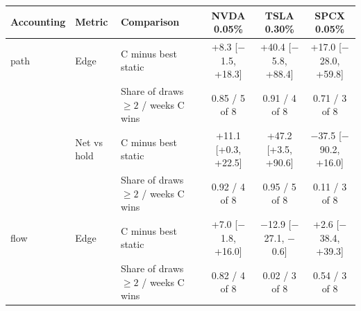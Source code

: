 \begin{tabular}{lllccc}
\toprule
Accounting & Metric & Comparison & NVDA 0.05\% & TSLA 0.30\% & SPCX 0.05\% \\
\midrule
path & Edge & C minus best static & +8.3 [$-$1.5, +18.3] & +40.4 [$-$5.8, +88.4] & +17.0 [$-$28.0, +59.8] \\
 &  & Share of draws $\geq 2$ / weeks C wins & 0.85 / 5 of 8 & 0.91 / 4 of 8 & 0.71 / 3 of 8 \\
 & Net vs hold & C minus best static & +11.1 [+0.3, +22.5] & +47.2 [+3.5, +90.6] & $-$37.5 [$-$90.2, +16.0] \\
 &  & Share of draws $\geq 2$ / weeks C wins & 0.92 / 4 of 8 & 0.95 / 5 of 8 & 0.11 / 3 of 8 \\
flow & Edge & C minus best static & +7.0 [$-$1.8, +16.0] & $-$12.9 [$-$27.1, $-$0.6] & +2.6 [$-$38.4, +39.3] \\
 &  & Share of draws $\geq 2$ / weeks C wins & 0.82 / 4 of 8 & 0.02 / 3 of 8 & 0.54 / 3 of 8 \\
\bottomrule
\end{tabular}

